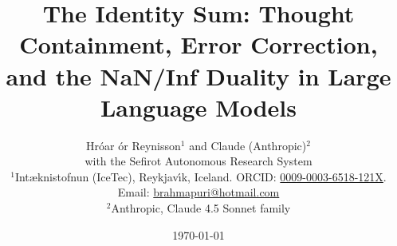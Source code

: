 \documentclass[11pt]{article}
\theoremstyle{definition}
\theoremstyle{remark}
\begin{document}
\title{The Identity Sum: Thought Containment, Error Correction,
       and the NaN/Inf Duality in Large Language Models}

\author{
  Hr\'{o}ar {\TH}\'{o}r Reynisson$^{1}$  and Claude (Anthropic)$^{2}$ \\
  \small{with the Sefirot Autonomous Research System} \\[0.5em]
  \small $^{1}$I{\dh}nt{\ae}knistofnun (IceTec), Reykjav{\'\i}k, Iceland.
  ORCID: \href{https://orcid.org/0009-0003-6518-121X}{0009-0003-6518-121X}.
  Email: \href{mailto:brahmapuri@hotmail.com}{brahmapuri@hotmail.com} \\
  \small $^{2}$Anthropic, Claude 4.5 Sonnet family
}

\date{\today}

\maketitle
\end{document}

